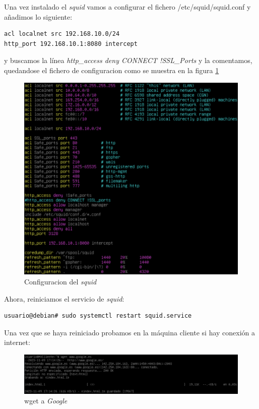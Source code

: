 \documentclass{report}
\begin{document}
  Una vez instalado el \emph{squid} vamos a configurar el fichero /etc/squid/squid.conf y añadimos lo siguiente:

  \begin{verbatim}
acl localnet src 192.168.10.0/24
http_port 192.168.10.1:8080 intercept
  \end{verbatim}

  y buscamos la línea \emph{http\_access deny CONNECT !SSL\_Ports} y la comentamos, quedandose el fichero de configuracion como se muestra en la figura \ref{fig:squid config}
  
  \begin{figure}[H]
    \centering
    \includegraphics[scale=0.65]{img/config_squid.png}
    \caption{Configuracion del \emph{squid}}
    \label{fig:squid config}
  \end{figure}

  Ahora, reiniciamos el servicio de \emph{squid}:
  \begin{verbatim}
usuario@debian# sudo systemctl restart squid.service
  \end{verbatim}

  Una vez que se haya reiniciado probamos en la máquina cliente si hay conexión a internet:

  \begin{figure}[H]
    \centering
    \includegraphics[scale=0.63]{img/wget_google.png}
    \caption{wget a \emph{Google}}
    \label{fig:wget google}
  \end{figure}
\end{document}
